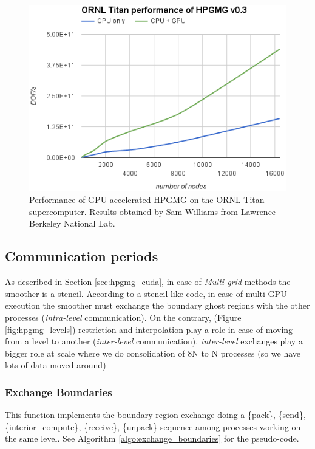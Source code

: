 \documentclass[conference]{IEEEtran}
\begin{document}
\begin{figure}[h]
\includegraphics[scale=0.7]{hpgmg_ornl_titan_perf_cuda.png}
\caption{Performance of GPU-accelerated HPGMG on the ORNL Titan supercomputer. Results obtained by Sam Williams from Lawrence Berkeley National Lab.}
\label{fig:hpgmg_ornl_bench}
\end{figure}


\subsection{Communication periods}\label{sec:hpgmg_cuda_communications}

As described in Section \ref{sec:hpgmg_cuda}, in case of \emph{Multi-grid} methods the smoother is a stencil. According to a stencil-like code, in case of multi-GPU execution the smoother must exchange the boundary ghost regions with the other processes (\emph{intra-level} communication). On the contrary, (Figure \ref{fig:hpgmg_levels}) restriction and interpolation play a role in case of moving from a level to another (\emph{inter-level} communication).
\emph{inter-level} exchanges play a bigger role at scale where we do consolidation of 8N to N processes (so we have lots of data moved around)

\subsubsection{Exchange Boundaries}

This function implements the boundary region exchange doing a \{pack\}, \{send\}, \{interior\_compute\}, \{receive\}, \{unpack\} sequence among processes working on the same level. See Algorithm \ref{algo:exchange_boundaries} for the pseudo-code.
\end{document}
